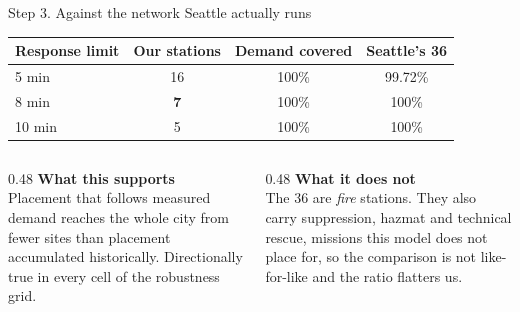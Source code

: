 \documentclass[aspectratio=169,10pt]{beamer}
\begin{document}
\begin{frame}{Step 3. Against the network Seattle actually runs}
  \vspace{0.3em}
  \centering
  {\footnotesize
  \begin{tabular}{@{}lccc@{}}
    \toprule
    \textbf{Response limit} & \textbf{Our stations} & \textbf{Demand covered} & \textbf{Seattle's 36} \\
    \midrule
    \phantom{0}5 min & 16 & 100\% & 99.72\% \\
    \phantom{0}8 min & \textbf{\color{s1}7} & 100\% & 100\% \\
    10 min & \phantom{0}5 & 100\% & 100\% \\
    \bottomrule
  \end{tabular}}
  \vspace{1.1em}

  \begin{columns}[T,onlytextwidth]
    \begin{column}{0.48\textwidth}
      {\color{good}\textbf{What this supports}}\\[0.3em]
      {\footnotesize\color{inks}Placement that follows measured demand reaches
      the whole city from fewer sites than placement accumulated
      historically. Directionally true in every cell of the robustness grid.}
    \end{column}
    \begin{column}{0.48\textwidth}
      {\color{s2}\textbf{What it does not}}\\[0.3em]
      {\footnotesize\color{inks}The 36 are \emph{fire} stations. They also
      carry suppression, hazmat and technical rescue, missions this model does
      not place for, so the comparison is not like-for-like and the ratio
      flatters us.}
    \end{column}
  \end{columns}
\end{frame}
\end{document}
